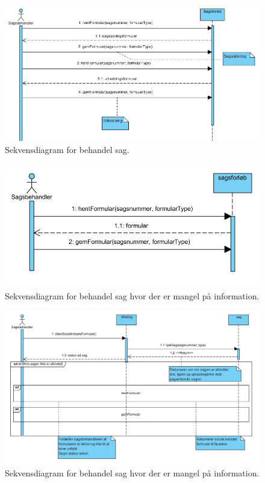 \newpage
\begin{figure}[hbt!]
  \includegraphics[width=\linewidth]{./PNG/sekDiaBehandelSag.PNG} 
  \caption{Sekvensdiagram for behandel sag.}
  \label{fig:SagforInd}
\end{figure}

\begin{figure}[hbt!]
  \includegraphics[width=\linewidth]{./PNG/sekDiaBehandelSagMangel.PNG} 
  \caption{Sekvensdiagram for behandel sag hvor der er mangel på information.}
  \label{fig:BSMangel}
\end{figure}
\newpage
\begin{figure}[hbt!]
  \includegraphics[width=\linewidth]{./PNG/sekDiaAfgoereSagsbehandaaben.PNG} 
  \caption{Sekvensdiagram for behandel sag hvor der er mangel på information.}
  \label{fig:ASAA}
\end{figure}

